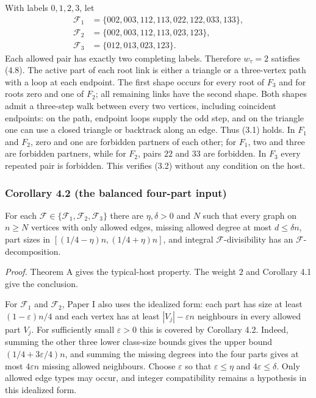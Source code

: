 \documentclass[english,11pt,a4paper]{article}
\begin{document}
With labels \(0,1,2,3\), let \[\begin{aligned}
\mathcal F_1&=\{002,003,112,113,022,122,033,133\},\\
\mathcal F_2&=\{002,003,112,113,023,123\},\\
\mathcal F_3&=\{012,013,023,123\}.
\end{aligned}
\tag{4.12}\] Each allowed pair has exactly two completing labels. Therefore \(w_\tau=2\) satisfies (4.8). The active part of each root link is either a triangle or a three-vertex path with a loop at each endpoint. The first shape occurs for every root of \(F_3\) and for roots zero and one of \(F_2\); all remaining links have the second shape. Both shapes admit a three-step walk between every two vertices, including coincident endpoints: on the path, endpoint loops supply the odd step, and on the triangle one can use a closed triangle or backtrack along an edge. Thus (3.1) holds. In \(F_1\) and \(F_2\), zero and one are forbidden partners of each other; for \(F_1\), two and three are forbidden partners, while for \(F_2\), pairs \(22\) and \(33\) are forbidden. In \(F_3\) every repeated pair is forbidden. This verifies (3.2) without any condition on the host.

\subsubsection{Corollary 4.2 (the balanced four-part input)}\label{corollary-4.2-the-balanced-four-part-input}

For each \(\mathcal F\in\{\mathcal F_1,\mathcal F_2,\mathcal F_3\}\) there are \(\eta,\delta>0\) and \(N\) such that every graph on \(n\ge N\) vertices with only allowed edges, missing allowed degree at most \(d\le\delta n\), part sizes in \([(1/4-\eta)n,(1/4+\eta)n]\), and integral \(\mathcal F\)-divisibility has an \(\mathcal F\)-decomposition.

\emph{Proof.} Theorem A gives the typical-host property. The weight \(2\) and Corollary 4.1 give the conclusion.

For \(\mathcal F_1\) and \(\mathcal F_2\), Paper I also uses the idealized form: each part has size at least \((1-\varepsilon)n/4\) and each vertex has at least \(|V_j|-\varepsilon n\) neighbours in every allowed part \(V_j\). For sufficiently small \(\varepsilon>0\) this is covered by Corollary 4.2. Indeed, summing the other three lower class-size bounds gives the upper bound \((1/4+3\varepsilon/4)n\), and summing the missing degrees into the four parts gives at most \(4\varepsilon n\) missing allowed neighbours. Choose \(\varepsilon\) so that \(\varepsilon\le\eta\) and \(4\varepsilon\le\delta\). Only allowed edge types may occur, and integer compatibility remains a hypothesis in this idealized form.
\end{document}
